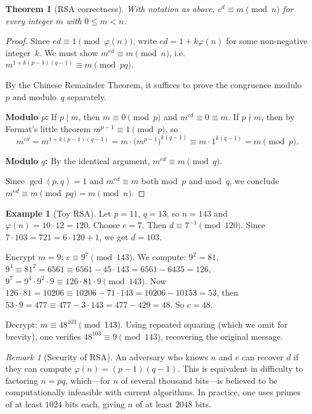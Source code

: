 \documentclass[12pt,a4paper,openany]{book}
\theoremstyle{definition}
\newtheorem{example}[definition]{Example}
\theoremstyle{plain}
\newtheorem{theorem}[definition]{Theorem}
\theoremstyle{remark}
\newtheorem{remark}[definition]{Remark}
\begin{document}
\begin{theorem}[RSA correctness]
\label{thm:rsa-correct}
With notation as above, $c^d \equiv m \pmod{n}$ for every integer $m$
with $0 \le m < n$.
\end{theorem}

\begin{proof}
Since $ed \equiv 1 \pmod{\varphi(n)}$, write $ed = 1 + k\varphi(n)$
for some non-negative integer~$k$.  We must show $m^{ed} \equiv m \pmod{n}$,
i.e.\ $m^{1 + k(p-1)(q-1)} \equiv m \pmod{pq}$.

By the Chinese Remainder Theorem, it suffices to prove the congruence
modulo~$p$ and modulo~$q$ separately.

\medskip\noindent
\textbf{Modulo $p$:}
If $p \mid m$, then $m \equiv 0 \pmod{p}$ and $m^{ed} \equiv 0 \equiv m$.
If $p \nmid m$, then by Fermat's little theorem $m^{p-1} \equiv 1 \pmod{p}$, so
\[
  m^{ed} = m^{1 + k(p-1)(q-1)} = m \cdot \bigl(m^{p-1}\bigr)^{k(q-1)}
  \equiv m \cdot 1^{k(q-1)} = m \pmod{p}.
\]

\medskip\noindent
\textbf{Modulo $q$:} By the identical argument, $m^{ed} \equiv m \pmod{q}$.

\medskip\noindent
Since $\gcd(p,q) = 1$ and $m^{ed} \equiv m$ both mod~$p$ and mod~$q$,
we conclude $m^{ed} \equiv m \pmod{pq} = m \pmod{n}$.
\end{proof}

\begin{example}[Toy RSA]
\label{ex:toy-rsa}
Let $p = 11$, $q = 13$, so $n = 143$ and $\varphi(n) = 10 \cdot 12 = 120$.
Choose $e = 7$.  Then $d \equiv 7^{-1} \pmod{120}$.  Since
$7 \cdot 103 = 721 = 6 \cdot 120 + 1$, we get $d = 103$.

Encrypt $m = 9$: $c \equiv 9^7 \pmod{143}$.  We compute:
$9^2 = 81$, $9^4 \equiv 81^2 = 6561 \equiv 6561 - 45 \cdot 143 = 6561 - 6435 = 126$,
$9^7 = 9^4 \cdot 9^2 \cdot 9 \equiv 126 \cdot 81 \cdot 9 \pmod{143}$.
Now $126 \cdot 81 = 10206 \equiv 10206 - 71 \cdot 143 = 10206 - 10153 = 53$,
then $53 \cdot 9 = 477 \equiv 477 - 3\cdot 143 = 477 - 429 = 48$.
So $c = 48$.

Decrypt: $m \equiv 48^{103} \pmod{143}$. Using repeated squaring (which
we omit for brevity), one verifies $48^{103} \equiv 9 \pmod{143}$, recovering
the original message.
\end{example}

\begin{remark}[Security of RSA]
\label{rem:rsa-security}
An adversary who knows $n$ and $e$ can recover $d$ if they can compute
$\varphi(n) = (p-1)(q-1)$.  This is equivalent in difficulty to factoring
$n = pq$, which---for $n$ of several thousand bits---is believed to be
computationally infeasible with current algorithms.  In practice, one
uses primes of at least $1024$ bits each, giving $n$ of at least $2048$ bits.
\end{remark}
\end{document}
